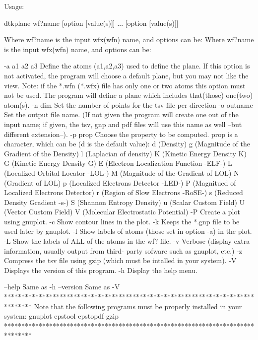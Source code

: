 Usage:

	dtkplane wf?name [option [value(s)]] ... [option [value(s)]]

Where wf?name is the input wfx(wfn) name, and options can be:
Where wf?name is the input wfx(wfn) name, and options can be:

  -a a1 a2 a3	Define the atoms  (a1,a2,a3) used to define the plane.
            	  If this option is not activated, the program will 
            	  choose a default plane, but you may not like the view.
            	  Note: if the *.wfn (*.wfx) file has only one or two atoms
            	  this option must not be used. The program will define
            	  a plane which includes that(those) one(two) atom(s).
  -n  dim   	Set the number of points for the tsv file per direction
  -o outname	Set the output file name.
            	  (If not given the program will create one out of
            	  the input name; if given, the tsv, gnp and pdf files will
            	  use this name as well --but different extension--).
  -p prop	Choose the property to be computed. prop is a character,
         	  which can be (d is the default value): 
         		d (Density)
         		g (Magnitude of the Gradient of the Density)
         		l (Laplacian of density)
         		K (Kinetic Energy Density K)
         		G (Kinetic Energy Density G)
         		E (Electron Localization Function -ELF-)
         		L (Localized Orbital Locator -LOL-)
         		M (Magnitude of the Gradient of LOL)
         		N (Gradient of LOL)
         		p (Localized Electrons Detector -LED-)
         		P (Magnitued of Localized Electrons Detector)
         		r (Region of Slow Electrons -RoSE-)
         		s (Reduced Density Gradient -s-)
         		S (Shannon Entropy Density)
         		u (Scalar Custom Field)
         		U (Vector Custom Field)
         		V (Molecular Electrostatic Potential)
  -P     	Create a plot using gnuplot.
  -c     	Show contour lines in the plot.
  -k     	Keeps the *.gnp file to be used later by gnuplot.
  -l     	Show labels of atoms (those set in option -a) in the plot.
  -L     	Show the labels of ALL of the atoms in the wf? file.
  -v     	Verbose (display extra information, usually output from third-
         	  party sofware such as gnuplot, etc.)
  -z     	Compress the tsv file using gzip (which must be intalled
         	   in your system).
  -V        	Displays the version of this program.
  -h     	Display the help menu.

  --help    		Same as -h
  --version 		Same as -V
********************************************************************************
  Note that the following programs must be properly installed in your system:
                                    gnuplot
                                    epstool
                                    epstopdf
                                      gzip
********************************************************************************
